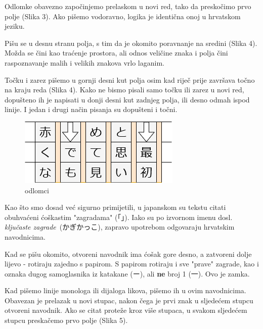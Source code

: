 		
	Odlomke obavezno započinjemo prelaskom u novi red, tako da preskočimo prvo polje (Slika 3). Ako pišemo vodoravno, logika je identična onoj u hrvatskom jeziku.

	
	Pišu se u desnu stranu polja, s tim da je okomito poravnanje na sredini (Slika 4). Možda se čini kao traćenje prostora, ali odnos veličine znaka i polja čini raspoznavanje malih i velikih znakova vrlo laganim.
	
	
	
	Točku i zarez pišemo u gornji desni kut polja osim kad riječ prije završava točno na kraju reda (Slika 4). Kako ne bismo pisali samo točku ili zarez u novi red, dopušteno ih je napisati u donji desni kut zadnjeg polja, ili desno odmah ispod linije. I jedan i drugi način pisanja su dopušteni i točni.
	
	\newpage
	
	
	\begin{figure}
		\centering
		\includegraphics[width=.3\textwidth]{017_pisanje_res/a3.png}
		\caption{odlomci}
	\end{figure}

	Kao što smo dosad već sigurno primijetili, u japanskom su tekstu citati obuhvaćeni ćoškastim "zagradama" (「」). Iako su po izvornom imenu dosl. \textit{ključaste zagrade}\ (かぎかっこ), zapravo upotrebom odgovaraju hrvatskim navodnicima.
	
	Kad se pišu okomito, otvoreni navodnik ima ćošak gore desno, a zatvoreni dolje lijevo - rotiraju zajedno s papirom. S papirom rotiraju i sve "prave" zagrade, kao i oznaka dugog samoglasnika iz katakane (ー), ali \textbf{ne} broj 1 (一). Ovo je zamka.
	
	Kad pišemo linije monologa ili dijaloga likova, pišemo ih u ovim navodnicima. Obavezan je prelazak u novi stupac, nakon čega je prvi znak u sljedećem stupcu otvoreni navodnik. Ako se citat proteže kroz više stupaca, u svakom sljedećem stupcu preskačemo prvo polje (Slika 5).
	
